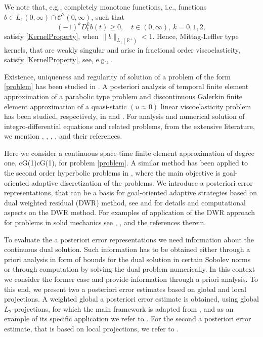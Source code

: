 \documentclass{amsart}
\numberwithin{equation}{section}
\theoremstyle{definition}
\begin{document}
We note that, e.g., completely monotone functions,  
i.e., functions $b\in L_1(0,\infty)\cap \mathcal{C}^2(0,\infty)$, such that
\begin{equation*}
  (-1)^kD_t^k b(t) \ge 0,\quad t \in (0,\infty),\ k=0,1,2,
\end{equation*}
satisfy \eqref{KernelProperty}, 
when $\|b\|_{L_1(\mathbb{R}^+)} < 1$.
Hence, Mittag-Leffler type kernels, that are weakly singular and 
arise in fractional order viscoelasticity, 
satisfy \eqref{KernelProperty}, see, e.g., \cite{StigFardin}. 

Existence, uniqueness and regularity of solution of a problem
of the form \eqref{problem} has been studied in 
\cite{FardinarXiv:1203.4001}.  A posteriori analysis of
temporal finite element approximation of a parabolic type problem
and discontinuous Galerkin finite element approximation of a
quasi-static $(\ddot u\approx0)$ linear 
viscoelasticity problem has been studied, respectively, in
\cite{Stig4} and \cite{ShawWhiteman}. For analysis and numerical solution 
of integro-differential equations and related problems, 
from the extensive literature, we mention  
\cite{Stig4}, \cite{StigFardin}, \cite{McLeanThomee2010}, \cite{RiviereShawWhiteman2007}, 
and their references. 

Here we consider a continuous space-time finite element approximation 
of degree one, cG(1)cG(1), for problem \eqref{problem}. 
A similar method has been applied to the second order hyperbolic 
problems in \cite{BangerthGeigerRannacher}, where the main objective  
is goal-oriented adaptive discretization of the problems. 
We introduce a posteriori error representations, 
that can be a basis for goal-oriented adaptive strategies based on dual 
weighted residual (DWR) method, 
see \cite{BangerthGeigerRannacher} and \cite{BangerthRannacher:Book} 
for details and computational aspects on the DWR method. 
For examples of application of the DWR approach for problems in solid mechanics see 
\cite{KaramanouShawWarbyWhiteman2005}, 
\cite{ShawWarbyWhiteman2010}, and the references therein.

To evaluate the a posteriori error representations 
we need information about the continuous dual solution.
Such information has to be obtained either through a priori
analysis in form of bounds for the dual solution in certain 
Sobolev norms or through computation by solving the dual 
problem numerically. In this context we consider the former case 
and provide information through a priori analysis. 
To this end, we present two a posteriori error estimates based 
on global and local projections. 
A weighted global a posteriori error estimate is obtained, using 
global $L_2$-projections, for which the main framework is adapted from 
\cite{ErikssonEstepHansboJohnson}, and as an example of its specific application we refer to \cite{Johnson}. For the second a posteriori error 
estimate, that is based on local projections, we refer to 
\cite{BangerthGeigerRannacher}.  
\end{document}
